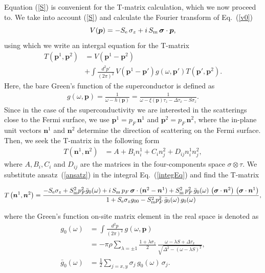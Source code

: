 \documentclass[twocolumn,showpacs,floatfix,longbibliography]{revtex4-1}
\begin{document}
Equation  (\ref{S}) is convenient for the T-matrix calculation, which we now proceed to. We take into account (\ref{S}) and calculate the Fourier transform of Eq.~(\ref{v0})  
\begin{equation}
	V(\bm p) = -S_{\rm e}\,\sigma_z +  i \,S_{\rm m} \, \bm \sigma\cdot \bm  p,
	\label{vp}
\end{equation}
using which we write an intergal equation for the T-matrix
\begin{align}
	T\left(\bm p^{1},\bm p^{2}\right) &= V \left(\bm p^{1}-\bm p^{2}\right) \nonumber \\
	& +\int \frac{d^2 p'}{\left( 2\pi \right)^2}\, V\left(\bm p^{1}-\bm p'\right) g(\omega,\bm p')  T\left(\bm p',\bm p^{2}\right).
	\label{integEq}
\end{align}
Here, the bare Green's function of the superconductor is defined as 
\begin{align}
	g(\omega,\bm p) = \frac{1}{\omega-h(\bm p)} = \frac{1}{\omega-\xi(\bm p)\tau_z-\Delta \tau_x - S\sigma_z}. \label{g}
\end{align}
Since in the case of the superconductivity we are interested in the scatterings close to the Fermi surface, we use $\bm p^{1} = p_F\, \bm n^{1}$ and $\bm p^{2} = p_F \,\bm n^{2}$, where the in-plane unit vectors $\bm n^{1}$ and $\bm n^{2}$ determine the direction of scattering on the Fermi surface.  Then, we seek the T-matrix in the following form
\begin{align}
	T\left(\bm n^{1},\bm n^{2}\right) &= A + B_i n^{1}_i + C_i n^{2}_j + D_{ij} n^{1}_i n^{2}_j, \label{ansatz}
\end{align}
where  $A,B_i,C_i$ and $D_{ij}$ are the matrices in the four-components space $\sigma\otimes\tau$. We substitute ansatz~(\ref{ansatz}) in the integral Eq.~(\ref{integEq}) and find the T-matrix
\begin{widetext}
\begin{equation}
	T\left(\bm n^{1},\bm n^{2}\right) = \frac{-S_{\rm e}\sigma_z+S^2_{\rm m}p_F^2\bar g_{0}(\omega)+i\,S_{\rm m}\,p_F \,  \bm \sigma\cdot(\bm n^{2}- \bm n^{1}) +S^2_{\rm m}\, p^2_F \, \bar g_{0}(\omega)\,\left(\bm \sigma\cdot\bm n^{2}\right)\,\left(\bm \sigma\cdot \bm n^{1}\right)}{1+S_{\rm e}\sigma_zg_{00}-S^2_{\rm m}p_F^2\,\bar g_{0}(\omega)\, g_{0}(\omega)}, \label{TM}
\end{equation}
\end{widetext}
where the Green's function on-site matrix element in the real space is denoted as 
\begin{align}
	g_{0}(\omega) &   =\int \frac{d^2 p}{\left( 2\pi \right)^2}\, g(\omega,\bm p)  	\label{g0} \\
	 & =-\pi\rho\sum_{\lambda = \pm 1} \frac{1+\lambda\sigma_z}{2}\,\frac{\omega-\lambda S+\Delta\tau_x}{\sqrt{\Delta^2-\left( \omega-\lambda S \right)^2}}, \nonumber \\
	 \bar g_{0}(\omega) & = \frac{1}{2} \sum_{j=x,y}\sigma_j\, g_{0}(\omega)\, \sigma_j.\label{bg0}
\end{align}
\end{document}
